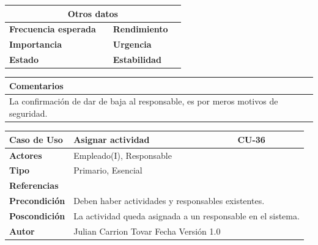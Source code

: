 \vspace{0.2cm}

\begin{table}[h!]
\centering
\begin{tabularx}{\textwidth}{|X|X|X|X|}
\hline
\multicolumn{4}{|c|}{\cellcolor[HTML]{F2F2F2}\textbf{Otros datos}} \\ \hline
\textbf{Frecuencia esperada} &  & \textbf{Rendimiento} &  \\ \hline
\textbf{Importancia} &  & \textbf{Urgencia} &  \\ \hline
\textbf{Estado} &  & \textbf{Estabilidad} &  \\ \hline
\end{tabularx}
\end{table}

\vspace{0.2cm}

\begin{table}[h!]
\centering
\begin{tabularx}{\textwidth}{|X|}
\hline
\cellcolor[HTML]{F2F2F2}\textbf{Comentarios} \\ \hline
La confirmación de dar de baja al responsable, es por meros motivos de seguridad. \\ \hline
\end{tabularx}
\end{table}



\clearpage
\begin{table}[h!]
\centering
\begin{tabularx}{\textwidth}{|l|X|X|}
\hline
\textbf{Caso de Uso} & Asignar actividad & CU-36 \\ \hline
\textbf{Actores} & \multicolumn{2}{l|}{Empleado(I), Responsable} \\ \hline
\textbf{Tipo} & \multicolumn{2}{l|}{Primario, Esencial} \\ \hline
\textbf{Referencias} & \multicolumn{2}{l|}{} \\ \hline
\textbf{Precondición} & \multicolumn{2}{l|}{Deben haber actividades y responsables existentes.} \\ \hline
\textbf{Poscondición} & \multicolumn{2}{l|}{La actividad queda asignada a un responsable en el sistema.} \\ \hline
\textbf{Autor} & \multicolumn{2}{l|}{Julian Carrion Tovar \hfill Fecha \hfill Versión 1.0} \\ \hline
\end{tabularx}
\end{table}


